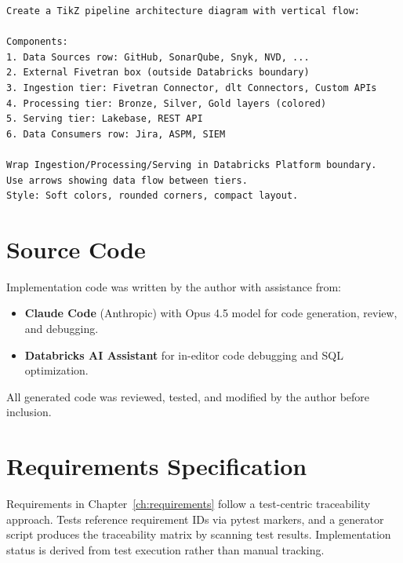\begin{lstlisting}[frame=single, backgroundcolor=\color{backcolour}, rulecolor=\color{framecolour}, basicstyle=\small\ttfamily, breaklines=true]
Create a TikZ pipeline architecture diagram with vertical flow:

Components:
1. Data Sources row: GitHub, SonarQube, Snyk, NVD, ...
2. External Fivetran box (outside Databricks boundary)
3. Ingestion tier: Fivetran Connector, dlt Connectors, Custom APIs
4. Processing tier: Bronze, Silver, Gold layers (colored)
5. Serving tier: Lakebase, REST API
6. Data Consumers row: Jira, ASPM, SIEM

Wrap Ingestion/Processing/Serving in Databricks Platform boundary.
Use arrows showing data flow between tiers.
Style: Soft colors, rounded corners, compact layout.
\end{lstlisting}

\section{Source Code}

Implementation code was written by the author with assistance from:

\begin{itemize}
    \item \textbf{Claude Code} (Anthropic) with Opus 4.5 model for code generation, review, and debugging.
    \item \textbf{Databricks AI Assistant} for in-editor code debugging and SQL optimization.
\end{itemize}

All generated code was reviewed, tested, and modified by the author before inclusion.

\section{Requirements Specification}

Requirements in Chapter~\ref{ch:requirements} follow a test-centric traceability approach. Tests reference requirement IDs via pytest markers, and a generator script produces the traceability matrix by scanning test results. Implementation status is derived from test execution rather than manual tracking.